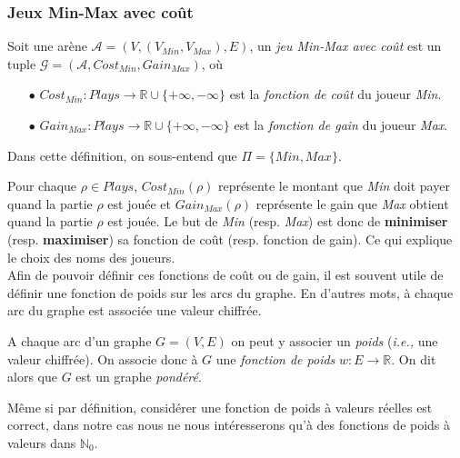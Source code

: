 
\subsubsection{Jeux Min-Max avec coût}


\begin{defi} $\text{ }$\\
	Soit une arène $\mathcal{A} = (V, (V_{Min}, V_{Max}), E) $, 
	un \textit{jeu Min-Max avec coût} est un tuple $\mathcal{G} = (\mathcal{A}, Cost_{Min}, Gain_{Max})$, où
	\begin{enumerate}
		\item[$\bullet$] $Cost_{Min}: Plays \rightarrow \mathbb{R} \cup \{+ \infty, -\infty \}$ est la \textit{fonction de coût} du joueur \textit{Min}.
		\item[$\bullet$] $Gain_{Max}: Plays \rightarrow \mathbb{R} \cup \{ + \infty, -\infty \}$ est la \textit{fonction de gain} du joueur \textit{Max}.
	\end{enumerate}
		
\end{defi}

\begin{rem}
	Dans cette définition, on sous-entend que $\Pi = \{ Min, Max \}$.
\end{rem}

Pour chaque $\rho \in Plays$, $Cost_{Min}(\rho)$ représente le montant que \textit{Min} doit payer quand la partie $\rho$ est jouée et $Gain_{Max}(\rho)$ représente le gain que \textit{Max} obtient quand la partie $\rho$ est jouée.
Le but de \textit{Min} (resp. \textit{Max}) est donc de \textbf{minimiser} (resp. \textbf{maximiser}) sa fonction de coût (resp. fonction de gain). Ce qui explique le choix des noms des joueurs.\\

Afin de pouvoir définir ces fonctions de coût ou de gain, il est souvent utile de définir une fonction de poids sur les arcs du graphe. En d'autres mots, à chaque arc du graphe est associée une valeur chiffrée.


\begin{defi}
	\label{def:fonctionPoids}
	A chaque arc d'un graphe $G = (V,E)$ on peut y associer un \textit{poids} (\emph{i.e.,} une valeur chiffrée). On associe donc à $G$ une \textit{fonction de poids}  $w : E \rightarrow \mathbb{R}$. On dit alors que $G$ est un graphe \textit{pondéré}.
\end{defi}
\begin{rem}
	Même si par définition, considérer une fonction de poids à valeurs réelles est correct, dans notre cas nous ne nous intéresserons qu'à des fonctions de poids à valeurs dans $\mathbb{N}_0$. 
\end{rem}


